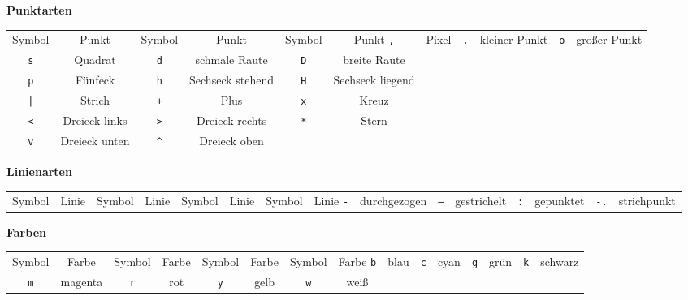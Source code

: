 \begin{tcolorbox}[title=Format-Strings für \texttt{plt.plot()}]
\textbf{Punktarten}
\vspace{-6pt}
\begin{center}
	\begin{tabular}{cc|cc|cc}
		Symbol     & Punkt         & Symbol                    & Punkt            & Symbol     & Punkt            \tabcrlf
		\texttt{,} & Pixel         & \texttt{.}                & kleiner Punkt    & \texttt{o} & großer Punkt     \\
		\texttt{s} & Quadrat       & \texttt{d}                & schmale Raute    & \texttt{D} & breite Raute     \\
		\texttt{p} & Fünfeck       & \texttt{h}                & Sechseck stehend & \texttt{H} & Sechseck liegend \\
		\texttt{|} & Strich        & \texttt{+}                & Plus             & \texttt{x} & Kreuz            \\
		\texttt{<} & Dreieck links & \texttt{>}                & Dreieck rechts   & \texttt{*} & Stern            \\
		\texttt{v} & Dreieck unten & \texttt{\textasciicircum} & Dreieck oben                                     \\
	\end{tabular}
\end{center}

\textbf{Linienarten}
\vspace{-15pt}
\begin{center}
	\begin{tabular}{cc|cc|cc|cc}
		Symbol     & Linie        & Symbol      & Linie       & Symbol     & Linie     & Symbol      & Linie       \tabcrlf
		\texttt{-} & durchgezogen & \texttt{--} & gestrichelt & \texttt{:} & gepunktet & \texttt{-.} & strichpunkt \\
	\end{tabular}
\end{center}
\end{tcolorbox}
%
\begin{tcolorbox}
\textbf{Farben}
\begin{center}
	\begin{tabular}{cc|cc|cc|cc}
		Symbol     & Farbe   & Symbol     & Farbe   & Symbol     & Farbe & Symbol     & Farbe  \tabcrlf
		\texttt{b} & blau    & \texttt{c} & cyan    & \texttt{g} & grün  & \texttt{k} & schwarz \\
		\texttt{m} & magenta & \texttt{r} & rot     & \texttt{y} & gelb  & \texttt{w} & weiß    \\
	\end{tabular}
\end{center}

\label{tab:PlotFormatStrings}
\end{tcolorbox}

